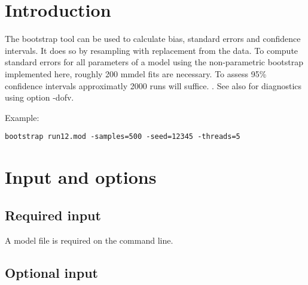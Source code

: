 



\maketitle
\newcommand{\guidetoolname}{bootstrap}


\section{Introduction}

The bootstrap tool can be used to calculate bias, standard errors and confidence intervals. 
It does so by resampling with replacement from the data. To compute standard errors for 
all parameters of a model using the non-parametric bootstrap implemented here, roughly 200 
mmdel fits are necessary. To assess 95\% confidence intervals approximatly 2000 runs will suffice.
\cite{Efron}. See also \cite{Niebecker} for diagnostics using option -dofv.

Example:
\begin{verbatim}
bootstrap run12.mod -samples=500 -seed=12345 -threads=5
\end{verbatim}

\section{Input and options}

\subsection{Required input}
A model file is required on the command line.

\subsection{Optional input}
	
